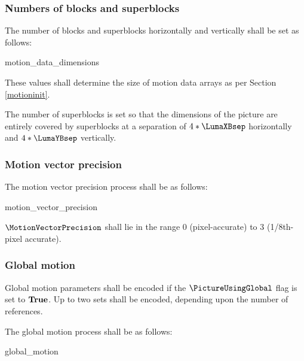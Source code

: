 \subsubsection{Numbers of blocks and superblocks}
\label{motiondatadimensions}

The number of blocks and superblocks horizontally and vertically shall be set
as follows:

\begin{pseudo}{motion\_data\_dimensions}{}
\end{pseudo} 

These values shall determine the size of motion data arrays as per Section
\ref{motioninit}. 

\begin{informative}
The number of superblocks is set so that the dimensions of the picture are
entirely covered by superblocks at a separation of $4*\LumaXBsep$ horizontally
and $4*\LumaYBsep$ vertically.
\end{informative}

\subsubsection{Motion vector precision}
\label{mvprecision}

The motion vector precision process shall be as follows:

\begin{pseudo}{motion\_vector\_precision}{}
\end{pseudo}

$\MotionVectorPrecision$ shall lie in the range 0 (pixel-accurate) to 3 (1/8th-pixel accurate).

\subsubsection{Global motion}
\label{globalmotion}

Global motion parameters shall be encoded if the $\PictureUsingGlobal$ flag is set
to $\text{\bf{True}}$. Up to two sets shall be encoded,
depending upon the number of references.

The global motion process shall be as follows:

\begin{pseudo}{global\_motion}{}
\bsIF{\PictureUsingGlobal==\true}
    \bsEND
\bsEND
\end{pseudo}

